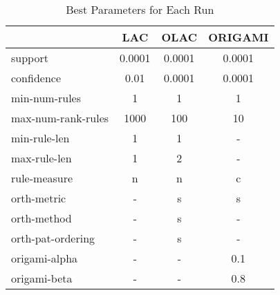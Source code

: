 \begin{table}[htbp]
	\centering
		\begin{tabular}{|l|c|c|c|}
		\hline
					& \textbf{LAC}	& \textbf{OLAC}	& \textbf{ORIGAMI}	\\
		\hline
		support			& 0.0001	& 0.0001	& 0.0001		\\
		\hline
		confidence		& 0.01		& 0.0001	& 0.0001		\\
		\hline
		min-num-rules		& 1		& 1		& 1			\\
		\hline
		max-num-rank-rules	& 1000		& 100		& 10			\\
		\hline
		min-rule-len		& 1		& 1		& -			\\
		\hline
		max-rule-len		& 1		& 2		& -			\\
		\hline
		rule-measure		& n		& n		& c			\\
		\hline
		orth-metric		& -		& s		& s			\\
		\hline
		orth-method		& -		& s		& -			\\
		\hline
		orth-pat-ordering	& -		& s		& -			\\
		\hline
		origami-alpha		& -		& -		& 0.1			\\
		\hline
		origami-beta		& -		& -		& 0.8			\\
		\hline
		\end{tabular}
	\caption{Best Parameters for Each Run}
	\label{tab:best_parms_for_avg_db}
\end{table}